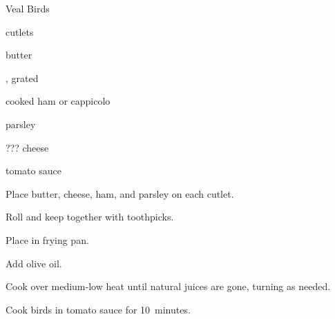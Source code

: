 \begin{recipe}{Veal Birds\FIXME}{}{}

\begin{ingredients}
\item {} cutlets
\item butter
\item {}, grated
\item cooked ham or cappicolo
\item parsley
\item ??? cheese
\item tomato sauce
\end{ingredients}

\begin{directions}
\item Place butter, cheese, ham, and parsley on each cutlet.
\item Roll and keep together with toothpicks.
\item Place in frying pan.
\item Add olive oil.
\item Cook over medium-low heat until natural juices are gone, turning as needed.
\item Cook birds in tomato sauce for 10~minutes.
\end{directions}

\end{recipe}
